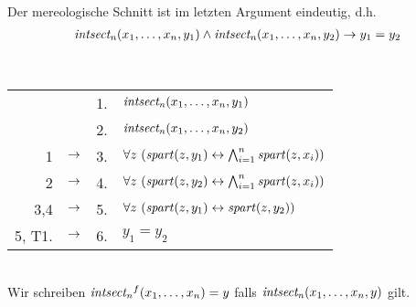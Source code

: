 \begin{satz}\ \\
    Der mereologische Schnitt ist im letzten Argument eindeutig, d.h.
    \begin{align*}
        \mathit{intsect_{n}}(x_{1},\ldots,x_{n},y_1) \land \mathit{intsect_{n}}(x_{1},\ldots,x_{n},y_2) \to y_1 = y_2
    \end{align*}
\end{satz}

\begin{bew}\ \\
    \begin{longtable}{r c c l}
        & & 1. & $\mathit{intsect_{n}}(x_{1},\ldots,x_{n},y_1)$\\
        & & 2. & $\mathit{intsect_{n}}(x_{1},\ldots,x_{n},y_2)$\\
        1 & $\rightarrow$ & 3. & $\forall z\ (\Gspart(z,y_1) \leftrightarrow \bigwedge^{n}_{i=1} \Gspart(z,x_{i}))$\\
        2 & $\rightarrow$ & 4. & $\forall z\ (\Gspart(z,y_2) \leftrightarrow \bigwedge^{n}_{i=1} \Gspart(z,x_{i}))$ \\
        3,4 & $\rightarrow$ & 5. & $\forall z\ (\Gspart(z,y_1) \leftrightarrow \Gspart(z,y_2))$ \\
        5, T1. & $\rightarrow$ & 6. & $y_1 = y_2$
    \end{longtable}
\end{bew}

\begin{konv}\ \\
    Wir schreiben $\mathit{intsect_{n}}^f(x_{1},\ldots,x_{n}) = y$ falls $\mathit{intsect_{n}}(x_{1},\ldots,x_{n},y)$ gilt.
\end{konv}



